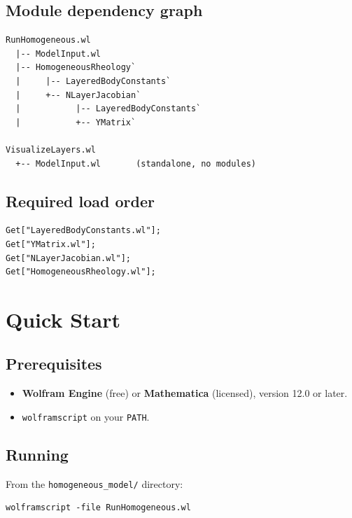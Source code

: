 \documentclass[11pt]{article}
\begin{document}
\subsection{Module dependency graph}

\begin{verbatim}
RunHomogeneous.wl
  |-- ModelInput.wl
  |-- HomogeneousRheology`
  |     |-- LayeredBodyConstants`
  |     +-- NLayerJacobian`
  |           |-- LayeredBodyConstants`
  |           +-- YMatrix`

VisualizeLayers.wl
  +-- ModelInput.wl       (standalone, no modules)
\end{verbatim}

\subsection{Required load order}

\begin{lstlisting}
Get["LayeredBodyConstants.wl"];
Get["YMatrix.wl"];
Get["NLayerJacobian.wl"];
Get["HomogeneousRheology.wl"];
\end{lstlisting}

\section{Quick Start}
\label{sec:quickstart}

\subsection{Prerequisites}

\begin{itemize}
  \item \textbf{Wolfram Engine} (free) or \textbf{Mathematica}
    (licensed), version 12.0 or later.
  \item \texttt{wolframscript} on your \texttt{PATH}.
\end{itemize}

\subsection{Running}

From the \texttt{homogeneous\_model/} directory:

\begin{lstlisting}[style=shell]
wolframscript -file RunHomogeneous.wl
\end{lstlisting}
\end{document}
